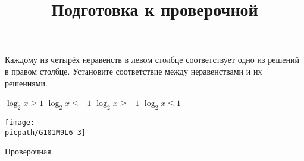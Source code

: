 \begin{class}[number=7]
	\title{Подготовка к проверочной}
	\begin{listofex}
		\item Каждому из четырёх неравенств в левом столбце соответствует одно из решений в правом столбце. Установите соответствие между неравенствами и их решениями. \\
		\begin{minipage}[t]{\bodywidth}
			\begin{tasks}
				\task \( \log_2 x \ge 1 \)
				\task \( \log_2 x \le -1 \)
				\task \( \log_2 x \ge -1 \)
				\task \( \log_2 x \le 1 \)
			\end{tasks}
		\end{minipage}
		\hspace{0.02\linewidth}
		\begin{minipage}[t]{\picwidth}
			\texttt{[image: \\picpath/G101M9L6-3]}
		\end{minipage}
	\end{listofex}
\end{class}

\begin{exam}
	\begin{listofex}
		\item Проверочная
	\end{listofex}
\end{exam}
